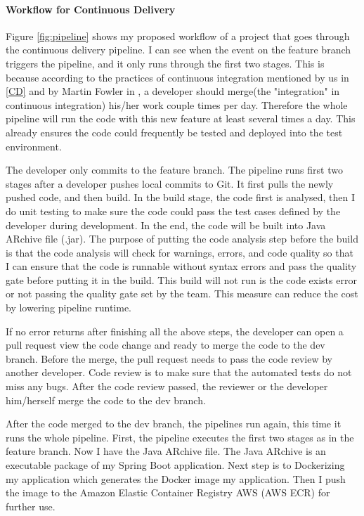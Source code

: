 \paragraph[]{Workflow for Continuous Delivery}
\label{workflow}
Figure \ref{fig:pipeline} shows my proposed workflow of a project that goes through the continuous delivery pipeline.
I can see when the event on the feature branch triggers the pipeline, and it only runs through the first two stages. This is because according to the practices of continuous integration mentioned by us in \ref{CD} and by Martin Fowler in \cite{fowler2006continuous}, a developer should merge(the "integration" in continuous integration) his/her work couple times per day. Therefore the whole pipeline will run the code with this new feature at least several times a day. This already ensures the code could frequently be tested and deployed into the test environment.
\par
The developer only commits to the feature branch. The pipeline runs first two stages after a developer pushes local commits to Git. It first pulls the newly pushed code, and then build. In the build stage, the code first is analysed, then I do unit testing to make sure the code could pass the test cases defined by the developer during development. In the end, the code will be built into Java ARchive file (.jar). The purpose of putting the code analysis step before the build is that the code analysis will check for warnings, errors, and code quality so that I can ensure that the code is runnable without syntax errors and pass the quality gate before putting it in the build. This build will not run is the code exists error or not passing the quality gate set by the team. This measure can reduce the cost by lowering pipeline runtime. 
\par
If no error returns after finishing all the above steps, the developer can open a pull request view the code change and ready to merge the code to the dev branch. Before the merge, the pull request needs to pass the code review by another developer. Code review is to make sure that the automated tests do not miss any bugs. After the code review passed, the reviewer or the developer him/herself merge the code to the dev branch.  
\par
After the code merged to the dev branch, the pipelines run again, this time it runs the whole pipeline. First, the pipeline executes the first two stages as in the feature branch. Now I have the Java ARchive file. The Java ARchive is an executable package of my Spring Boot application. Next step is to Dockerizing my application which generates the Docker image my application. Then I push the image to the Amazon Elastic Container Registry AWS (AWS ECR) for further use.
